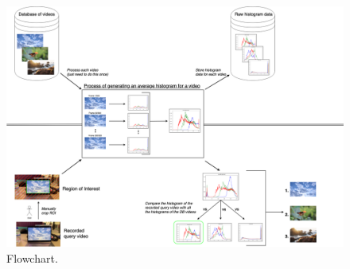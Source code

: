 \begin{figure}[h] 
\centerline{\includegraphics[width=\textwidth]{figures/implementation/CBVR-flowchart.png}}
\caption{\label{fig:CBVR flowchart}Flowchart.}
\end{figure}